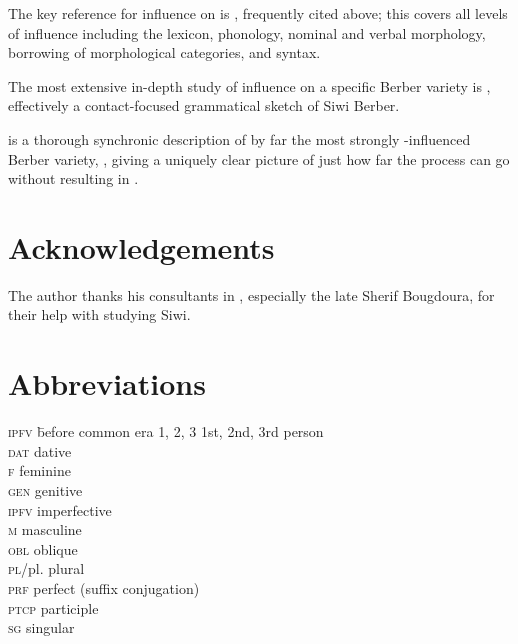 \documentclass[output=paper]{langsci/langscibook}
\begin{document}
The key reference for  influence on  is \citet{Kossmann2012}, frequently cited above; this covers all levels of influence including the lexicon, phonology, nominal and verbal morphology, borrowing of morphological categories, and syntax.
\largerpage

The most extensive in-depth study of  influence on a specific Berber variety is \citet{Souag2013book}, effectively a contact-focused grammatical sketch of Siwi Berber.

\begin{furtherreading}
\item[\citet{Mourigh2016}] is a thorough synchronic description of by far the most strongly -influenced Berber variety, , giving a uniquely clear picture of just how far the process can go without resulting in .
\end{furtherreading}

\section*{Acknowledgements}

The author thanks his consultants in , especially the late Sherif Bougdoura, for their help with studying Siwi.

\section*{Abbreviations}
\begin{multicols}{2}
\begin{tabbing}
\textsc{ipfv} \hspace{1em} \= before common era\kill
\textsc{1, 2, 3} \> 1st, 2nd, 3rd person \\
\textsc{dat} \> dative \\
\textsc{f} \> feminine \\
\textsc{gen} \> genitive \\
\textsc{ipfv} \> imperfective  \\
\textsc{m} \> masculine \\
\textsc{obl} \> oblique \\
\textsc{pl}/pl. \> plural \\
\textsc{prf} \> perfect (suffix conjugation) \\
\textsc{ptcp} \> {participle} \\
\textsc{sg} \> singular
\end{tabbing}
\end{multicols}

\sloppy
\printbibliography[heading=subbibliography,notkeyword=this]
\end{document}
